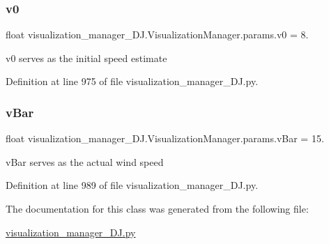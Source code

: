 \subsubsection{\texorpdfstring{v0}{v0}}
{\footnotesize\ttfamily float visualization\+\_\+manager\+\_\+\+D\+J.\+Visualization\+Manager.\+params.\+v0 = 8.\hspace{0.3cm}{\ttfamily [static]}}



v0 serves as the initial speed estimate 



Definition at line 975 of file visualization\+\_\+manager\+\_\+\+D\+J.\+py.

\mbox{\label{classvisualization__manager___d_j_1_1_visualization_manager_1_1params_a468678d5806ec035d997a40604e291f2}} 
\subsubsection{\texorpdfstring{v\+Bar}{vBar}}
{\footnotesize\ttfamily float visualization\+\_\+manager\+\_\+\+D\+J.\+Visualization\+Manager.\+params.\+v\+Bar = 15.\hspace{0.3cm}{\ttfamily [static]}}



v\+Bar serves as the \textquotesingle{}actual\textquotesingle{} wind speed 



Definition at line 989 of file visualization\+\_\+manager\+\_\+\+D\+J.\+py.



The documentation for this class was generated from the following file\+:\begin{DoxyCompactItemize}
\item 
\mbox{\hyperlink{visualization__manager___d_j_8py}{visualization\+\_\+manager\+\_\+\+D\+J.\+py}}\end{DoxyCompactItemize}
